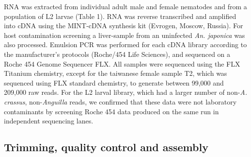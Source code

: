 RNA was extracted from individual adult male and female nematodes and
from a population of L2 larvae (Table 1). RNA was reverse transcribed
and amplified into cDNA using the MINT-cDNA synthesis kit (Evrogen,
Moscow, Russia).  For host contamination screening a liver-sample from
an uninfected \textit{An. japonica} was also processed. Emulsion PCR
was performed for each cDNA library according to the manufacturer’s
protocols (Roche/454 Life Sciences), and sequenced on a Roche 454
Genome Sequencer FLX. All samples were sequenced using the FLX
Titanium chemistry, except for the taiwanese female sample T2, which
was sequenced using FLX standard chemistry, to generate between 99,000
and 209,000 raw reads. For the L2 larval library, which had a larger
number of non-\textit{A. crassus}, non-\textit{Anguilla} reads, we
confirmed that these data were not laboratory contaminants by
screening Roche 454 data produced on the same run in independent
sequencing lanes.


\subsection*{Trimming, quality control and assembly}


